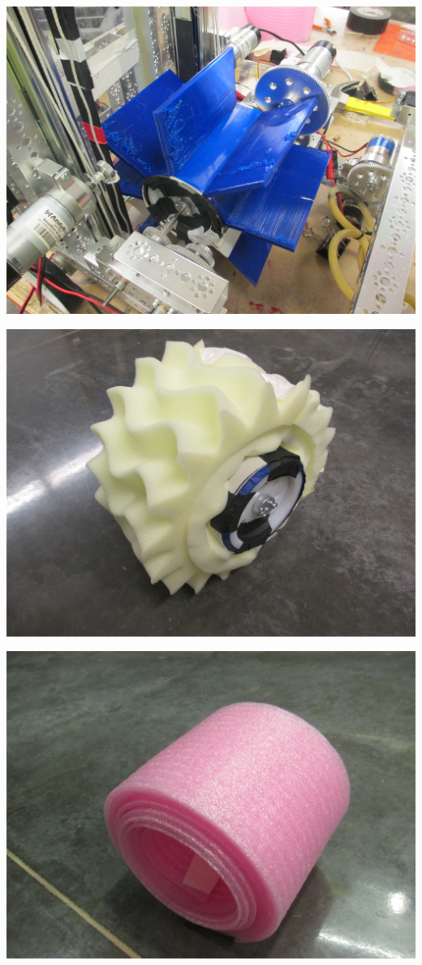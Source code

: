 \begin{center}
 \includegraphics[width=\textwidth]{./Entries/Images/launchProto7.JPG}

 \includegraphics[width=\textwidth]{./Entries/Images/launchProto2.JPG}

 \includegraphics[width=\textwidth]{./Entries/Images/launchProto12.JPG}
\end{center}

